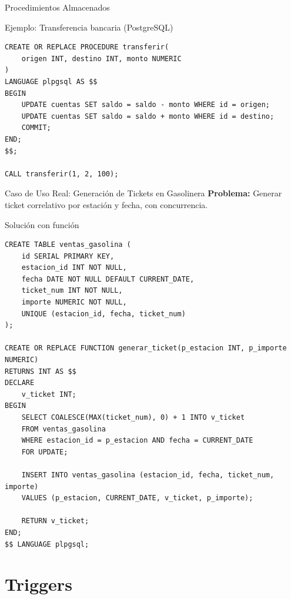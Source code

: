 \documentclass[aspectratio=169, 10pt, xcolor=table]{beamer}
\begin{document}
\begin{frame}[fragile]{Procedimientos Almacenados}
    \begin{block}{Ejemplo: Transferencia bancaria (PostgreSQL)}
        \begin{lstlisting}
CREATE OR REPLACE PROCEDURE transferir(
    origen INT, destino INT, monto NUMERIC
)
LANGUAGE plpgsql AS $$
BEGIN
    UPDATE cuentas SET saldo = saldo - monto WHERE id = origen;
    UPDATE cuentas SET saldo = saldo + monto WHERE id = destino;
    COMMIT;
END;
$$;

CALL transferir(1, 2, 100);
        \end{lstlisting}
    \end{block}
\end{frame}

\begin{frame}[fragile]{Caso de Uso Real: Generación de Tickets en Gasolinera}
    \textbf{Problema:} Generar ticket correlativo por estación y fecha, con concurrencia.
    \begin{block}{Solución con función}
        \begin{lstlisting}
CREATE TABLE ventas_gasolina (
    id SERIAL PRIMARY KEY,
    estacion_id INT NOT NULL,
    fecha DATE NOT NULL DEFAULT CURRENT_DATE,
    ticket_num INT NOT NULL,
    importe NUMERIC NOT NULL,
    UNIQUE (estacion_id, fecha, ticket_num)
);

CREATE OR REPLACE FUNCTION generar_ticket(p_estacion INT, p_importe NUMERIC)
RETURNS INT AS $$
DECLARE
    v_ticket INT;
BEGIN
    SELECT COALESCE(MAX(ticket_num), 0) + 1 INTO v_ticket
    FROM ventas_gasolina
    WHERE estacion_id = p_estacion AND fecha = CURRENT_DATE
    FOR UPDATE;

    INSERT INTO ventas_gasolina (estacion_id, fecha, ticket_num, importe)
    VALUES (p_estacion, CURRENT_DATE, v_ticket, p_importe);

    RETURN v_ticket;
END;
$$ LANGUAGE plpgsql;
        \end{lstlisting}
    \end{block}
\end{frame}

\section{Triggers}
\end{document}
